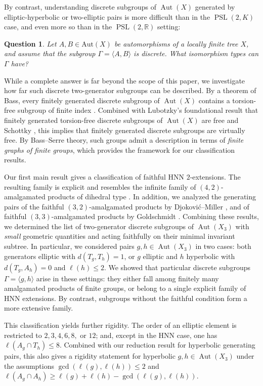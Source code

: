 \documentclass[12pt,leqno]{amsart}
\newcommand{\2}{L^2_{\rm per}(0, T)}
\newtheorem{ques}{Question}[section]
\newcommand{\aut}{{\operatorname{Aut}}}
\newcommand{\psl}{{\operatorname{PSL}}}
\numberwithin{equation}{section}
\numberwithin{figure}{section}
\begin{document}
By contrast, understanding discrete subgroups of $\aut(X)$ generated by elliptic-hyperbolic or two-elliptic pairs is more difficult than in the $\psl(2,K)$ case, and even more so than in the $\psl(2,\mathbb{R})$ setting:
\begin{ques}\label{ques}
    Let $A,B \in \mathrm{Aut}(X)$ be automorphisms of a locally finite tree $X$, and assume that the subgroup $\Gamma = \langle A,B \rangle$ is discrete. What isomorphism types can $\Gamma$ have?
\end{ques}
While a complete answer is far beyond the scope of this paper, we investigate how far such discrete two-generator subgroups can be described. By a theorem of Bass, every finitely generated discrete subgroup of $\aut(X)$ contains a torsion-free subgroup of finite index \cite{bass1990uniform}. Combined with Lubotzky’s foundational result that finitely generated torsion-free discrete subgroups of $\aut(X)$ are free and Schottky \cite{lubotzky1991lattices}, this implies that finitely generated discrete subgroups are virtually free. By Bass–Serre theory, such groups admit a description in terms of \emph{finite graphs of finite groups}, which provides the framework for our classification results.

Our first main result gives a classification of faithful HNN $2$-extensions. The resulting family is explicit and resembles the infinite family of $(4,2)$-amalgamated products of dihedral type \cite{djokovic1980class}. In addition, we analyzed the generating pairs of the faithful $(3,2)$-amalgamated products by Djokovi\'c--Miller \cite{djokovic1977regular}, and of faithful $(3,3)$-amalgamated products by Goldschmidt \cite{goldschmidt1980automorphisms}. Combining these results, we determined the list of two-generator discrete subgroups of $\aut(X_3)$ with \emph{small} geometric quantities and acting faithfully on their minimal invariant subtree. In particular, we considered pairs $g,h\in\aut(X_3)$ in two cases: both generators elliptic with $d(T_g,T_h)=1$, or $g$ elliptic and $h$ hyperbolic with $d(T_g,A_h)=0$ and $\ell(h)\leq 2$. We showed that particular discrete subgroups $\Gamma=\langle g,h\rangle$ arise in these settings: they either fall among finitely many amalgamated products of finite groups, or belong to a single explicit family of HNN extensions. By contrast, subgroups without the faithful condition form a more extensive family.

This classification yields further rigidity. The order of an elliptic element is restricted to $2,3,4,6,8,$ or $12$; and, except in the HNN case, one has $\ell(A_g\cap T_h)\leq 8$. Combined with our reduction result for hyperbolic generating pairs, this also gives a rigidity statement for hyperbolic $g,h\in\aut(X_3)$ under the assumptions $\gcd(\ell(g),\ell(h))\leq 2$ and $\ell(A_g\cap A_h)\geq \ell(g)+\ell(h)-\gcd(\ell(g),\ell(h))$.
\end{document}
